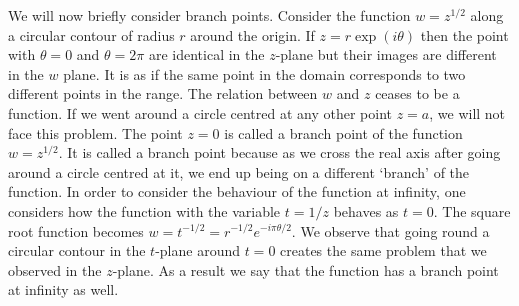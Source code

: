 We will now briefly consider branch points. Consider the function $w = z^{1/2}$
along a circular contour of radius $r$ around the origin. If $z=r\exp(i\theta)$
then the point with $\theta = 0$ and $\theta = 2\pi$ are identical in the 
$z$-plane but their images are different in the $w$ plane. It is as if the same
point in the domain corresponds to two different points in the range. The 
relation between $w$ and $z$ ceases to be a function. If we went around a circle
centred at any other point $z = a$, we will not face this problem. The point $z
= 0$ is called a branch point of the function $w = z^{1/2}$. It is called a 
branch point because as we cross the real axis after going around a circle
centred at it, we end up being on a different `branch' of the function. In order
to consider the behaviour of the function at infinity, one considers
how the function with the variable $t = 1/z$ behaves as $t = 0$. The square
root function becomes $w=t^{-1/2}=r^{-1/2}e^{-i\pi\theta/2}$. We observe that
going round a circular contour in the $t$-plane around $t = 0$ creates the same
problem that we observed in the $z$-plane. As a result we say that the function
has a branch point at infinity as well.
